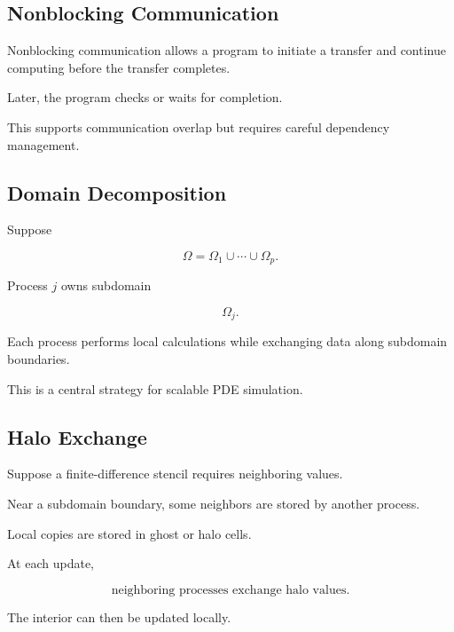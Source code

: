 \subsection{Nonblocking Communication}
\label{subsec:nonblocking-communication}

Nonblocking communication allows a program to initiate a transfer and
continue computing before the transfer completes.

Later, the program checks or waits for completion.

This supports communication overlap but requires careful dependency
management.

\subsection{Domain Decomposition}
\label{subsec:hpmc-domain-decomposition}

Suppose

\[
\Omega
=
\Omega_1
\cup
\cdots
\cup
\Omega_p.
\]

Process \(j\) owns subdomain

\[
\Omega_j.
\]

Each process performs local calculations while exchanging data along
subdomain boundaries.

This is a central strategy for scalable PDE simulation.

\subsection{Halo Exchange}
\label{subsec:hpmc-halo-exchange}

Suppose a finite-difference stencil requires neighboring values.

Near a subdomain boundary, some neighbors are stored by another process.

Local copies are stored in ghost or halo cells.

At each update,

\[
\boxed{
\text{neighboring processes exchange halo values}.
}
\]

The interior can then be updated locally.

